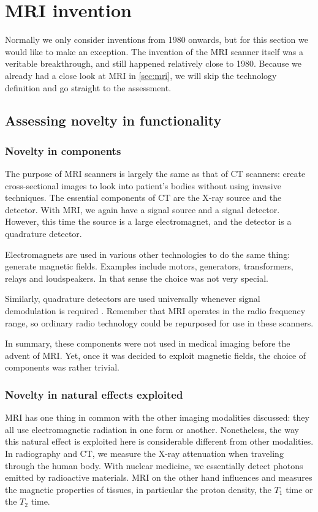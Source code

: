 \section{MRI invention}
Normally we only consider inventions from 1980 onwards, but for this section we
would like to make an exception. The invention of the MRI scanner itself was a
veritable breakthrough, and still happened relatively close to 1980. Because we
already had a close look at MRI in \autoref{sec:mri}, we will skip the
technology definition and go straight to the assessment.

\subsection{Assessing novelty in functionality}
\subsubsection{Novelty in components}
The purpose of MRI scanners is largely the same as that of CT scanners: create
cross-sectional images to look into patient's bodies without using invasive
techniques. The essential components of CT are the X-ray source and the
detector. With MRI, we again have a signal source and a signal detector.
However, this time the source is a large electromagnet, and the detector is a
quadrature detector.

Electromagnets are used in various other technologies to do the same thing:
generate magnetic fields. Examples include motors, generators, transformers,
relays and loudspeakers. In that sense the choice was not very special.

Similarly, quadrature detectors are used universally whenever signal
demodulation is required \cite{quadrature}. Remember that MRI operates in the
radio frequency range, so ordinary radio technology could be repurposed for use
in these scanners.

In summary, these components were not used in medical imaging before the advent
of MRI. Yet, once it was decided to exploit magnetic fields, the choice of
components was rather trivial.

\subsubsection{Novelty in natural effects exploited}
MRI has one thing in common with the other imaging modalities discussed: they
all use electromagnetic radiation in one form or another. Nonetheless, the way
this natural effect is exploited here is considerable different from other
modalities. In radiography and CT, we measure the X-ray attenuation when
traveling through the human body. With nuclear medicine, we essentially detect
photons emitted by radioactive materials. MRI on the other hand influences and
measures the magnetic properties of tissues, in particular the proton density,
the $T_1$ time or the $T_2$ time.

